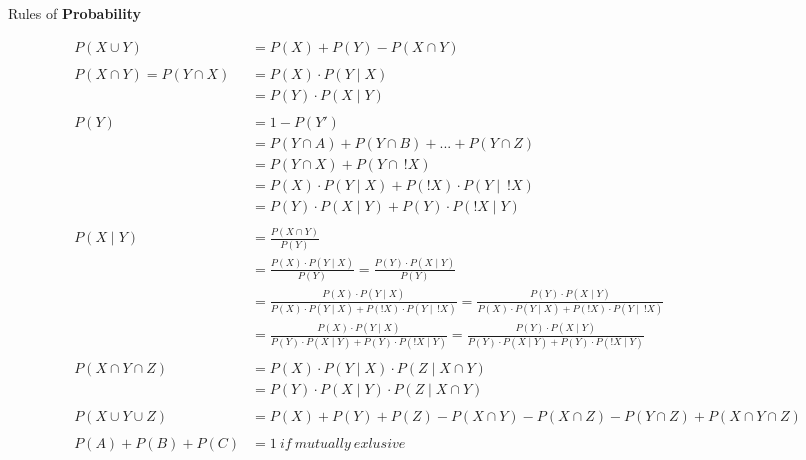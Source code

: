 \documentclass{article}
\begin{document}
\begin{small}



Rules of \textbf{Probability}

\begin{multicols}{2}
\begin{align*}
P(X \cup Y) & = P(X) + P(Y) - P(X \cap Y) \\\\
P(X \cap Y) = P(Y \cap X) & = P(X) \cdot P(Y \mid X) \\
                          & = P(Y) \cdot P(X \mid Y) \\\\
P(Y)        & = 1 - P(Y') \\
            & = P(Y \cap A) + P(Y \cap B) + ... + P(Y \cap Z)\\
            & = P(Y \cap X) + P(Y \cap \ !X) \\
            & = P(X) \cdot P(Y \mid X) + P(!X) \cdot P(Y \mid \ !X) \\
            & = P(Y) \cdot P(X \mid Y) + P(Y) \cdot P(!X \mid Y) \\\\
P(X \mid Y) & = \frac{P(X \cap Y)}{P(Y)} \\
            & = \frac{P(X) \cdot P(Y \mid X)}{P(Y)} = \frac{P(Y) \cdot P(X \mid Y)}{P(Y)} \\
            & = \frac{P(X) \cdot P(Y \mid X)}{P(X) \cdot P(Y \mid X) + P(!X) \cdot P(Y \mid \ !X)} 
              = \frac{P(Y) \cdot P(X \mid Y)}{P(X) \cdot P(Y \mid X) + P(!X) \cdot P(Y \mid \ !X)}\\
            & = \frac{P(X) \cdot P(Y \mid X)}{P(Y) \cdot P(X \mid Y) + P(Y) \cdot P(!X \mid Y)}
              = \frac{P(Y) \cdot P(X \mid Y)}{P(Y) \cdot P(X \mid Y) + P(Y) \cdot P(!X \mid Y)}\\\\
P(X \cap Y \cap Z) & = P(X) \cdot P(Y \mid X) \cdot P(Z \mid X \cap Y)\\
                   & = P(Y) \cdot P(X \mid Y) \cdot P(Z \mid X \cap Y)\\\\
P(X \cup Y \cup Z) & = P(X) + P(Y) + P(Z) - P(X \cap Y) - P(X \cap Z) - P(Y \cap Z) + P(X \cap Y \cap Z)\\\\
P(A) + P(B) + P(C) & = 1 \ if \ mutually \ exlusive
\end{align*}


\end{multicols}
\end{small}
\end{document}
